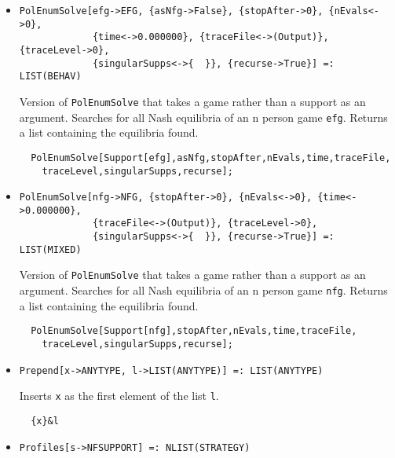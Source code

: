 \begin{itemize}
\item{}
\protect \large \begin{verbatim}
PolEnumSolve[efg->EFG, {asNfg->False}, {stopAfter->0}, {nEvals<->0}, 
             {time<->0.000000}, {traceFile<->(Output)}, {traceLevel->0}, 
             {singularSupps<->{  }}, {recurse->True}] =: LIST(BEHAV)
\end{verbatim}\normalsize

\bd 
Version of \verb+PolEnumSolve+ that takes a game rather than a support
as an argument.  Searches for all Nash equilibria of an n person game
\verb+efg+.  Returns a list containing the equilibria found.

\begin{verbatim}
  PolEnumSolve[Support[efg],asNfg,stopAfter,nEvals,time,traceFile,
    traceLevel,singularSupps,recurse];
\end{verbatim} 
\ed

\item{}
\protect \large \begin{verbatim}
PolEnumSolve[nfg->NFG, {stopAfter->0}, {nEvals<->0}, {time<->0.000000}, 
             {traceFile<->(Output)}, {traceLevel->0}, 
             {singularSupps<->{  }}, {recurse->True}] =: LIST(MIXED)
\end{verbatim}\normalsize

\bd 
Version of \verb+PolEnumSolve+ that takes a game rather than a support
as an argument.  Searches for all Nash equilibria of an n person game
\verb+nfg+.  Returns a list containing the equilibria found.

\begin{verbatim}
  PolEnumSolve[Support[nfg],stopAfter,nEvals,time,traceFile,
    traceLevel,singularSupps,recurse];
\end{verbatim} 
\ed

\item{}
\protect \large \begin{verbatim}
Prepend[x->ANYTYPE, l->LIST(ANYTYPE)] =: LIST(ANYTYPE) 
\end{verbatim}\normalsize

\bd 
Inserts \verb+x+ as the first element of the list \verb+l+.  
\begin{verbatim}
  {x}&l
\end{verbatim} 
\ed

\item{}
\protect \large \begin{verbatim}
Profiles[s->NFSUPPORT] =: NLIST(STRATEGY) 
\end{verbatim}\normalsize


\end{itemize}
